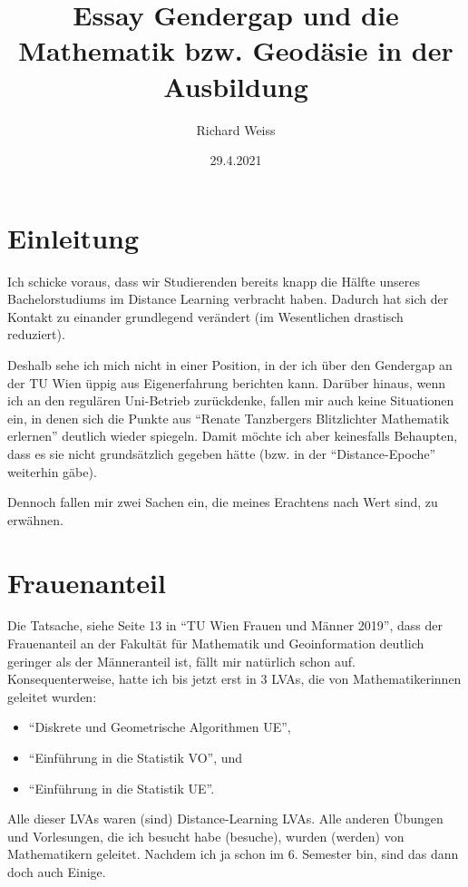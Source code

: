 \documentclass{article}
\title{Essay Gendergap und die Mathematik bzw. Geodäsie in der Ausbildung}
\author{Richard Weiss}
\date{29.4.2021}
\begin{document}
\maketitle

\section*{Einleitung}

Ich schicke voraus, dass wir Studierenden bereits knapp die Hälfte unseres Bachelorstudiums im Distance Learning verbracht haben.
Dadurch hat sich der Kontakt zu einander grundlegend verändert (im Wesentlichen drastisch reduziert).

Deshalb sehe ich mich nicht in einer Position, in der ich über den Gendergap an der TU Wien üppig aus Eigenerfahrung berichten kann.
Darüber hinaus, wenn ich an den regulären Uni-Betrieb zurückdenke, fallen mir auch keine Situationen ein, in denen sich die Punkte aus \enquote{Renate Tanzbergers Blitzlichter Mathematik erlernen} deutlich wieder spiegeln.
Damit möchte ich aber keinesfalls Behaupten, dass es sie nicht grundsätzlich gegeben hätte (bzw. in der \enquote{Distance-Epoche} weiterhin gäbe).

Dennoch fallen mir zwei Sachen ein, die meines Erachtens nach Wert sind, zu erwähnen.

\section*{Frauenanteil}

Die Tatsache, siehe Seite 13 in \enquote{TU Wien Frauen und Männer 2019}, dass der Frauenanteil an der Fakultät für Mathematik und Geoinformation deutlich geringer als der Männeranteil ist, fällt mir natürlich schon auf.
Konsequenterweise, hatte ich bis jetzt erst in 3 LVAs, die von Mathematikerinnen geleitet wurden:

\begin{itemize}
	\item \enquote{Diskrete und Geometrische Algorithmen UE},
	\item \enquote{Einführung in die Statistik VO}, und
	\item \enquote{Einführung in die Statistik UE}.
\end{itemize}

Alle dieser LVAs waren (sind) Distance-Learning LVAs.
Alle anderen Übungen und Vorlesungen, die ich besucht habe (besuche), wurden (werden) von Mathematikern geleitet.
Nachdem ich ja schon im 6. Semester bin, sind das dann doch auch Einige.
\end{document}
